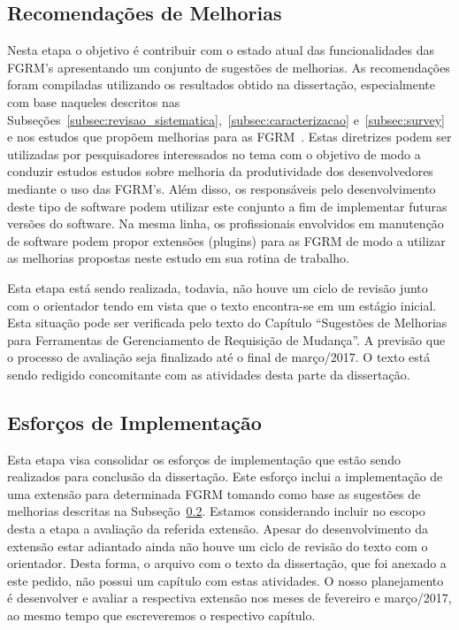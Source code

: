 \documentclass[10pt,a4paper]{report}
\begin{document}
	\subsection{Recomendações de Melhorias}
	\label{subsec:recomendacoes}

	Nesta etapa o objetivo é contribuir com o estado atual das funcionalidades das
	FGRM's apresentando um conjunto de sugestões de melhorias. As recomendações
	foram compiladas utilizando os resultados obtido na dissertação, especialmente
	com base naqueles descritos nas
	Subseções~\ref{subsec:revisao_sistematica},~\ref{subsec:caracterizacao}
	e~\ref{subsec:survey} e nos estudos que propõem melhorias para as
	FGRM~\cite{zimmermann2009improving, bettenburg2008makes, singh2011bug}. Estas
	diretrizes podem ser utilizadas por pesquisadores interessados no tema com o
	objetivo de modo a conduzir estudos estudos sobre melhoria da produtividade dos
	desenvolvedores mediante o uso das FGRM's. Além disso, os responsáveis pelo
	desenvolvimento deste tipo de software podem utilizar este conjunto a fim de
	implementar futuras versões do software. Na mesma linha, os profissionais
	envolvidos em manutenção de software podem propor extensões (plugins) para as
	FGRM de modo a utilizar as melhorias propostas neste estudo em sua rotina de
	trabalho.

	Esta etapa está sendo realizada, todavia, não houve um ciclo de revisão junto
	com o orientador tendo em vista que o texto encontra-se em um estágio inicial.
	Esta situação pode ser verificada pelo texto do Capítulo ``Sugestões de
	Melhorias para Ferramentas de Gerenciamento de Requisição de Mudança''. A
	previsão que o processo de avaliação seja finalizado até o final de março/2017.
	O texto está sendo redigido concomitante com as atividades desta parte da
	dissertação.

	\subsection{Esforços de Implementação}
	\label{subsec:recomendacoes}

	Esta etapa visa consolidar os esforços de implementação que estão sendo realizados
	para conclusão da dissertação. Este esforço inclui a implementação de uma
	extensão para determinada FGRM tomando como base as sugestões de melhorias
	descritas na Subseção~\ref{subsec:recomendacoes}. Estamos considerando incluir
	no escopo desta a etapa a avaliação da referida extensão. Apesar do
	desenvolvimento da extensão estar adiantado ainda não houve um ciclo de revisão
	do texto com o orientador. Desta forma, o arquivo com o texto da dissertação,
	que foi anexado a este pedido, não possui um capítulo com estas atividades. O
	nosso planejamento é desenvolver e avaliar a respectiva extensão nos meses de
	fevereiro e março/2017, ao mesmo tempo que escreveremos o respectivo capítulo.
\end{document}
